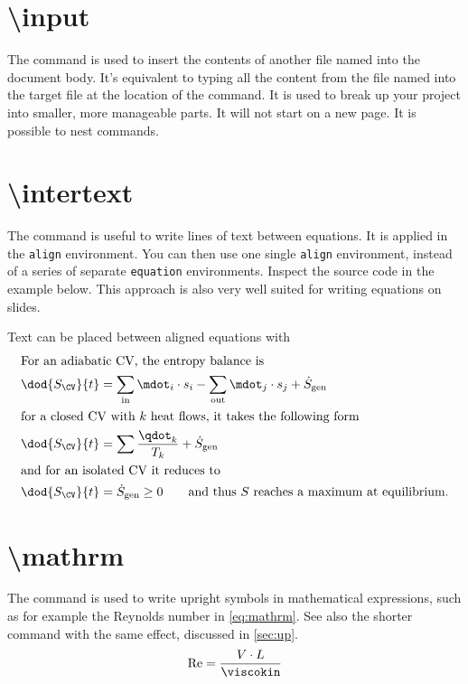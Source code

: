 \section{\textbackslash input}
The  command is used to insert the contents of another file named  into the document body. It's equivalent to typing all the content from the file named  into the target file at the location of the  command. It is used to break up your project into smaller, more manageable parts. It will not start on a new page. It is possible to nest  commands.

\section{\textbackslash intertext}
The command  is useful to write lines of text between equations. It is applied in the \verb|align| environment. You can then use one single \verb|align| environment, instead of a series of separate \verb|equation| environments. Inspect the source code in the example below. This approach is also very well suited for writing equations on slides.
\begin{frame}{Text can be placed between aligned equations with }
    \begin{align}
        \intertext{For an adiabatic CV, the entropy balance is} 
        &\dod{S_\CV}{t}=\sum_\up{in}\mdot_i\cdot s_i-\sum_\up{out}\mdot_j\cdot s_j+\dot{S}_\up{gen}\\
        \intertext{for a closed CV with $k$ heat flows, it takes the following form}
        &\dod{S_\CV}{t}=\sum\frac{\qdot_k}{T_k}+\dot{S}_\up{gen}\\
        \intertext{and for an isolated CV it reduces to}
        &\dod{S_\CV}{t}=\dot{S}_\up{gen}\geq 0\qquad\text{and thus $S$ reaches a maximum at equilibrium.}\label{eq:Smax}
    \end{align} 
\end{frame}

\section{\textbackslash mathrm}\label{sec:mathrm}
The command  is used to write upright symbols in mathematical expressions, such as for example the Reynolds number in \cref{eq:mathrm}. See also the shorter command  with the same effect, discussed in \cref{sec:up}.
\begin{equation}\label{eq:mathrm}
    \mathrm{Re}=\frac{\vel\cdot L}{\viscokin}
\end{equation}

